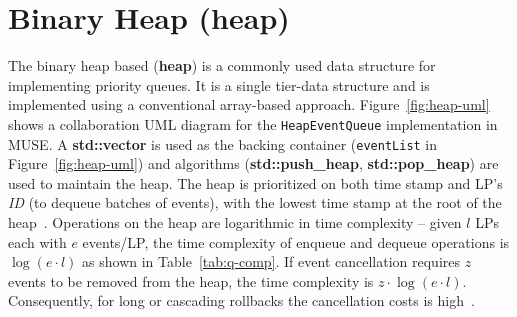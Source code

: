 \section{Binary Heap (heap)} 
The binary heap based (\textbf{heap}) is a commonly used data structure for implementing priority queues. It is a single tier-data structure and is implemented using a conventional array-based approach.  Figure~\ref{fig:heap-uml} shows a collaboration UML diagram for the \texttt{HeapEventQueue} implementation in MUSE.   A \textbf{std::vector} is used as the backing container (\texttt{eventList} in Figure~\ref{fig:heap-uml}) and algorithms (\textbf{std::push\_heap}, \textbf{std::pop\_heap}) are used to maintain the heap. The heap is prioritized on both time stamp and LP's \emph{ID} (to dequeue batches of events), with the lowest time stamp at the root of the heap~\cite{gebre-2009}. Operations on the heap are logarithmic in time complexity -- given $l$ LPs each with $e$ events/LP, the time complexity of enqueue and dequeue operations is $\log(e\cdot l)$ as shown in Table~\ref{tab:q-comp}. If event cancellation requires $z$ events to be removed from the heap, the time complexity is $z\cdot \log(e\cdot l)$. Consequently, for long or cascading rollbacks the cancellation costs is high~\cite{higiro2017multi}.

